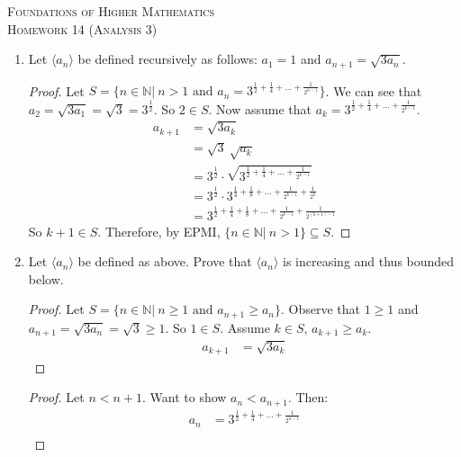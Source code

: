 \documentclass{article}
\theoremstyle{problem}
\theoremstyle{plain}
\theoremstyle{remark}
\begin{document}
\begin{center}
  \textsc{\Large Foundations of Higher Mathematics}\\[.3cm]
  \textsc{\Large Homework 14 (Analysis 3)}
\end{center}

\begin{enumerate}
\item Let $\langle a_n \rangle$ be defined recursively as follows: $a_1 = 1$ and $a_{n+1} = \sqrt{3a_n}$. 
\begin{proof}
  Let $S = \{n \in \mathbb N|\ n > 1 \text{ and } a_n = 3^{\frac{1}{2} + \frac{1}{4} + \ldots + \frac{1}{2^{n-1}}}\}$. We can see that $a_2 = \sqrt{3a_1} = \sqrt{3} = 3^{\frac{1}{2}}$. So $2 \in S$. Now assume that $a_k = 3^{\frac{1}{2} + \frac{1}{4} + \ldots + \frac{1}{2^{k-1}}}$.
  \begin{align*}
    a_{k+1} &= \sqrt{3 a_k}\\
    &= \sqrt{3}\ \sqrt{a_k}\\
    &= 3^{\frac{1}{2}} \cdot \sqrt{3^{\frac{1}{2} + \frac{1}{4} + \ldots + \frac{1}{2^{k-1}}}}\\
    &= 3^{\frac{1}{2}} \cdot 3^{\frac{1}{4} + \frac{1}{8} + \ldots + \frac{1}{2^{k-1}} + \frac{1}{2^k}}\\
    &= 3^{\frac{1}{2} + \frac{1}{4} + \frac{1}{8} + \ldots + \frac{1}{2^{k-1}} + \frac{1}{2^{(k+1)-1}}}
  \end{align*}
So $k + 1 \in S$. Therefore, by EPMI, $\{n \in \mathbb N|\ n > 1 \} \subseteq S$.
\end{proof}
\item Let $\langle a_n \rangle$ be defined as above. Prove that $\langle a_n \rangle$ is increasing and thus bounded below.
\begin{proof}
  Let $S = \{n \in \mathbb N|\ n \geq 1 \text{ and } a_{n+1} \geq a_n\}$. Observe that $1 \geq 1$ and $a_{n+1} = \sqrt{3a_n} = \sqrt{3} \geq 1$. So $1 \in S$. Assume $k \in S$, $a_{k+1} \geq a_k$.
\begin{align*}
  a_{k+1} &= \sqrt{3 a_k}  
\end{align*}
\end{proof}
 \begin{proof}
  Let $n < n + 1$. Want to show $a_n < a_{n+1}$. Then:
\begin{align*}
  a_n &= 3^{\frac{1}{2} + \frac{1}{4} + \ldots + \frac{1}{2^{n-1}}}\\

\end{align*}
\end{proof}
\end{enumerate}
\end{document}
